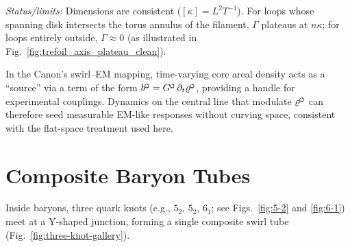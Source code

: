 \documentclass[11pt]{article}
\newcommand{\swirlarrow}{%
    \mathchoice{\mkern-2mu\scriptstyle\boldsymbol{\circlearrowleft}}%
    {\mkern-2mu\scriptstyle\boldsymbol{\circlearrowleft}}%
    {\mkern-2mu\scriptscriptstyle\boldsymbol{\circlearrowleft}}%
    {\mkern-2mu\scriptscriptstyle\boldsymbol{\circlearrowleft}}%
}
\begin{document}
    \noindent\emph{Status/limits:} Dimensions are consistent ($[\kappa]=L^2T^{-1}$). For loops whose spanning disk intersects the torus annulus of the filament, $\Gamma$ plateaus at $n\kappa$; for loops entirely outside, $\Gamma\approx 0$ (as illustrated in Fig.~\ref{fig:trefoil_axis_plateau_clean}).

    \begin{tcolorbox}[title=\textbf{Swirl–EM correspondence (operational note)}]
        In the Canon’s swirl–EM mapping, time-varying core areal density acts as a “source” via a term of the form $b^{\swirlarrow}=G^{\swirlarrow}\,\partial_t \varrho^{\swirlarrow}$, providing a handle for experimental couplings. Dynamics on the central line that modulate $\varrho^{\swirlarrow}$ can therefore seed measurable EM-like responses without curving space, consistent with the flat-space treatment used here.
    \end{tcolorbox}

\section{Composite Baryon Tubes}
    Inside baryons, three quark knots (e.g., $5_2$, $5_2$, $6_1$; see Figs.~\ref{fig:5-2} and \ref{fig:6-1}) meet at a Y-shaped junction, forming a single composite swirl tube (Fig.~\ref{fig:three-knot-gallery}).
\end{document}
